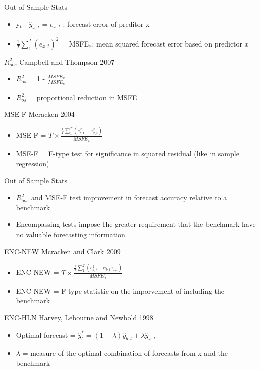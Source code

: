 \documentclass{beamer}
\begin{document}
\begin{frame}{Out of Sample Stats}
	    \begin{itemize}
	    	\item y$_{t}$ - $\hat{y}_{x,t}$ =  $e_{x,t}$ : forecast error of preditor x
	    	\item $\frac{1}{T}\sum_{1}^{T}(e_{x,t})^{2}$ = MSFE$_{x}$: mean squared forecast error based on predictor $x$
	    \end{itemize}
	    \begin{block}{$R_{oos}^{2}$ Campbell and Thompson 2007}
	    	\begin{itemize}
	    		\item $R^{2}_{os}$ = 1 - $\frac{MSFE_{x}}{MSFE_{b}}$
	    		\item $R^{2}_{os}$ = proportional reduction in MSFE
	    	\end{itemize}
	    \end{block}
	    \begin{block}{MSE-F Mcracken 2004}
	    	\begin{itemize}
	    		\item MSE-F = $T \times \frac{\frac{1}{T}\sum_{1}^{T}(e_{b,t}^{2}-e_{x,t}^{2})}{MSFE_{x}}$
	    		\item MSE-F = F-type test for significance in squared residual (like in sample regression)
	    	\end{itemize}
	    \end{block}
\end{frame}

\begin{frame}{Out of Sample Stats}
	\begin{itemize}
		\item $R_{oos}^{2}$ and MSE-F test improvement in forecast accuracy relative to a benchmark
		\item Encompassing tests impose the greater requirement that the benchmark have no valuable forecasting information
	\end{itemize}
	\begin{block}{ENC-NEW Mcracken and Clark 2009}
		\begin{itemize}
			\item ENC-NEW = $T\times \frac{\frac{1}{T}\sum_{1}^{T}(e_{b,t}^{2}-e_{b,t}e_{x,t})}{MSFE_{x}}$
			\item ENC-NEW = F-type statistic on the imporvement of including the benchmark
		\end{itemize}
	\end{block}
	\begin{block}{ENC-HLN Harvey, Lebourne and Newbold 1998}
		\begin{itemize}
			\item Optimal forecast = $\hat{y}^{*}_{t} = (1-\lambda)\hat{y}_{b,t} + \lambda \hat{y}_{x,t}$
			\item $\lambda$ = measure of the optimal combination of forecasts from x and the benchmark
		\end{itemize}
	\end{block}
\end{frame}
\end{document}

